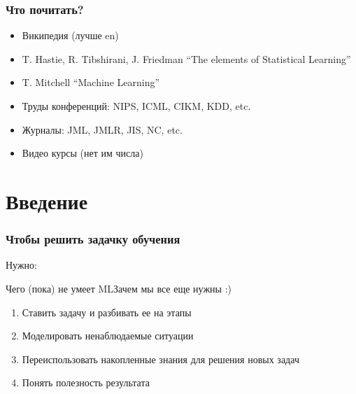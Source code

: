 \documentclass[14pt, fleqn, xcolor={dvipsnames, table}]{beamer}
\begin{document}
\begin{frame}
\frametitle{Что почитать?}
\begin{itemize}
 	\item Википедия (лучше en)
\end{itemize}
\begin{itemize}
 	\item T. Hastie, R. Tibshirani, J. Friedman “The elements of Statistical Learning”
 	\item T. Mitchell “Machine Learning”
\end{itemize}
\begin{itemize}
 	\item Труды конференций: NIPS, ICML, CIKM, KDD, etc.
 	\item Журналы: JML, JMLR, JIS, NC, etc.
 	\item Видео курсы (нет им числа)
\end{itemize}
\end{frame}

\section{Введение}

\begin{frame}
\frametitle{Чтобы решить задачку обучения}
Нужно:
\end{frame}

\begin{frame}{Чего (пока) не умеет ML}{Зачем мы все еще нужны :)}
\begin{enumerate}
	\item Ставить задачу и разбивать ее на этапы
	\item Моделировать ненаблюдаемые ситуации
	\item Переиспользовать накопленные знания для решения новых задач
	\item Понять полезность результата
\end{enumerate}
\end{frame}
\end{document}

